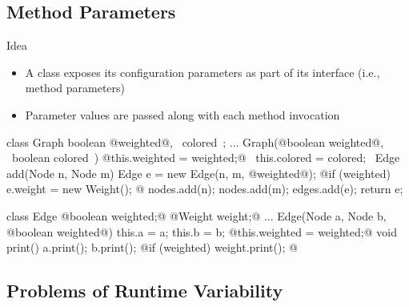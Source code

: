\subsection{Method Parameters}
\begin{frame}[fragile]{\myframetitle}
	\begin{fancycolumns}[t]
		\begin{definition}{Idea}
			\begin{itemize}
				\item A class exposes its configuration parameters as part of its interface (i.e., method parameters)
				\item Parameter values are passed along with each method invocation
			\end{itemize}
		\end{definition}
		\small
\begin{codetight}{}
class Graph {
	boolean @weighted@, ~colored~;
	...
	Graph(@boolean weighted@, ~boolean colored~) {
		@this.weighted = weighted;@ ~this.colored = colored;~
	}
	Edge add(Node n, Node m) {
		Edge e = new Edge(n, m, @weighted@);
		@if (weighted) { e.weight = new Weight(); }@
		nodes.add(n); nodes.add(m); edges.add(e);
		return e;
	}
}
\end{codetight}
	\nextcolumn
	\small
\begin{codetight}{}
class Edge {
	@boolean weighted;@
	@Weight weight;@
	...
	Edge(Node a, Node b, @boolean weighted@) {
		this.a = a; this.b = b;
		@this.weighted = weighted;@
	}
	void print() {
		a.print(); b.print();
		@if (weighted) { weight.print(); }@
	}
}
\end{codetight}
		\normalsize
	\end{fancycolumns}
\end{frame}


\subsection{Problems of Runtime Variability}

